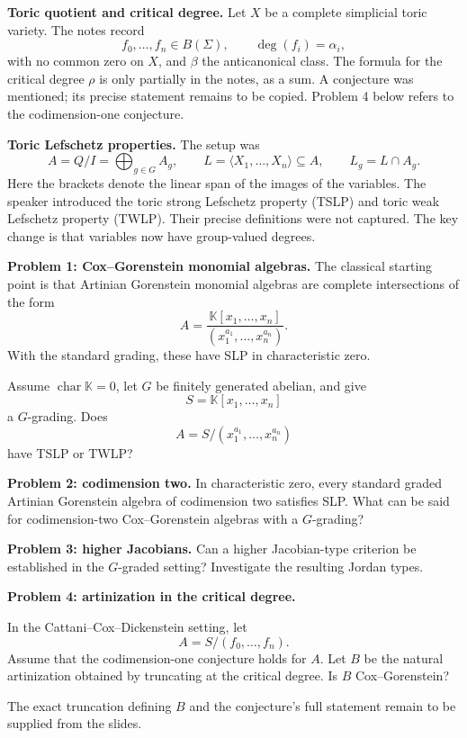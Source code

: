 \medskip\noindent
\textbf{Toric quotient and critical
degree.}
Let $X$ be a complete simplicial toric
variety. The notes record
$$
f_0,\ldots,f_n\in B(\Sigma),
\qquad \deg(f_i)=\alpha_i,
$$
with no common zero on $X$, and
$\beta$ the anticanonical class.
The formula for the critical degree
$\rho$ is only partially in the notes,
as a sum. A conjecture was mentioned;
its precise statement remains to be
copied. Problem 4 below refers to the
codimension-one conjecture.

\medskip\noindent
\textbf{Toric Lefschetz properties.}
The setup was
$$
A=Q/I=\bigoplus_{g\in G}A_g,
\qquad
L=\langle X_1,\ldots,X_n\rangle
\subseteq A,
\qquad L_g=L\cap A_g.
$$
Here the brackets denote the linear
span of the images of the variables.
The speaker introduced the toric strong
Lefschetz property (TSLP) and toric weak
Lefschetz property (TWLP).
Their precise definitions were not
captured. The key change is that
variables now have group-valued degrees.

\medskip\noindent
\textbf{Problem 1: Cox--Gorenstein
monomial algebras.}
The classical starting point is that
Artinian Gorenstein monomial algebras
are complete intersections of the form
$$
A=\frac{\mathbb{K}[x_1,\ldots,x_n]}
{(x_1^{a_1},\ldots,x_n^{a_n})}.
$$
With the standard grading, these have
SLP in characteristic zero.

Assume $\operatorname{char}\mathbb{K}=0$,
let $G$ be finitely generated abelian,
and give
$$
S=\mathbb{K}[x_1,\ldots,x_n]
$$
a $G$-grading.
Does
$$
A=S/(x_1^{a_1},\ldots,x_n^{a_n})
$$
have TSLP or TWLP?

\medskip\noindent
\textbf{Problem 2: codimension two.}
In characteristic zero, every standard
graded Artinian Gorenstein algebra of
codimension two satisfies SLP.
What can be said for codimension-two
Cox--Gorenstein algebras with a
$G$-grading?

\medskip\noindent
\textbf{Problem 3: higher Jacobians.}
Can a higher Jacobian-type criterion
be established in the $G$-graded
setting? Investigate the resulting
Jordan types.

\medskip\noindent
\textbf{Problem 4: artinization in the
critical degree.}
\par\nopagebreak\noindent
In the Cattani--Cox--Dickenstein
setting, let
$$
A=S/(f_0,\ldots,f_n).
$$
Assume that the codimension-one
conjecture holds for $A$.
Let $B$ be the natural artinization
obtained by truncating at the critical
degree. Is $B$ Cox--Gorenstein?

The exact truncation defining $B$ and
the conjecture's full statement remain
to be supplied from the slides.

